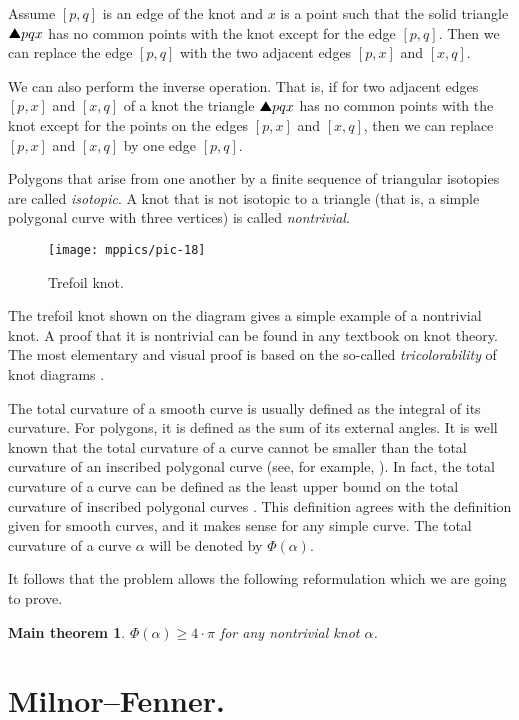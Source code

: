 \documentclass{article}
\theoremstyle{theorem}
\newtheorem*{maintheorem}{Main theorem}
\newtheorem{Crofton-type formula}[theorem]{Crofton-type formula}
\newtheorem{Douglas--Rado theorem}[theorem]{Douglas--Rado theorem}
\newtheorem{Extended monotonicity theorem}[theorem]{Extended monotonicity theorem}
\theoremstyle{definition}
\def\solidtriangle{\text{\ding{115}}}
\begin{document}
Assume $[p,q]$ is an edge of the knot and $x$
is a point such that the solid triangle $\solidtriangle pqx$  has no common points with the knot except for the edge $[p,q]$.
Then we can replace the edge $[p,q]$ with the two adjacent edges $[p,x]$ and $[x,q]$.

We can also perform the inverse operation.
That is, if for two adjacent edges $[p,x]$ and $[x,q]$ of a knot the triangle
$\solidtriangle pqx$ has no common points with the knot except for the points on the edges $[p,x]$ and $[x,q]$,
then we can replace $[p,x]$ and $[x,q]$ by one edge $[p,q]$.

Polygons that arise from one another by a finite sequence of
triangular isotopies are called \emph{isotopic}.
A knot that is not isotopic to a triangle (that is, a simple polygonal curve with three vertices) is called \emph{nontrivial}.

\begin{figure}[!ht]
\vskip-0mm
\centering
\texttt{[image: mppics/pic-18]}
\vskip0mm
\caption{Trefoil knot.}
\end{figure}

The trefoil knot shown on the diagram gives a simple example of a nontrivial knot.
A proof that it is nontrivial can be found in any textbook on knot theory.
The most elementary and visual proof is based on the so-called \emph{tricolorability} of knot diagrams \cite[Section 1.5]{adams}.

The total curvature of a smooth curve is usually defined as the integral of its curvature.
For polygons, it is defined as the sum of its external angles.
It is well known that the total curvature of a curve cannot be smaller than the total curvature of an inscribed polygonal curve (see, for example, \cite{petrunin-zamora}).
In fact, the total curvature of a curve can be defined as the least upper bound on the total curvature of inscribed polygonal curves \cite{aleksandrov-reshetnyak, sullivan-curves}.
This definition agrees with the definition given for smooth curves, and it makes sense for any simple curve.
The total curvature of a curve $\alpha$ will be denoted by $\Phi(\alpha)$.

It follows that the problem allows the following reformulation which we are going to prove.

\begin{maintheorem}
\textit{$\Phi(\alpha)\ge 4{\cdot}\pi$ for any nontrivial knot $\alpha$.}
\end{maintheorem}

\section{Milnor--Fenner.}
\end{document}
